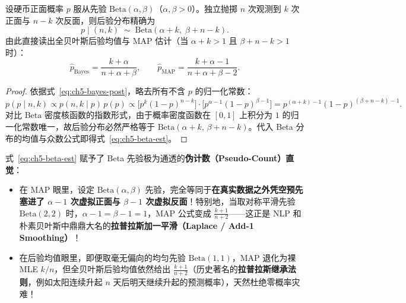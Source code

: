 \begin{thmBox}
\begin{theorem}
\label{thm:ch5-beta-bern}
设硬币正面概率 $p$ 服从先验 $\mathrm{Beta}(\alpha, \beta)$（$\alpha, \beta > 0$）。独立抛掷 $n$ 次观测到 $k$ 次正面与 $n-k$ 次反面，则后验分布精确为
\begin{equation}
  p \mid (n, k) \;\sim\; \mathrm{Beta}(\alpha + k,\; \beta + n - k).
  \label{eq:ch5-beta-post}
\end{equation}
由此直接读出全贝叶斯后验均值与 MAP 估计（当 $\alpha + k > 1$ 且 $\beta + n - k > 1$ 时）：
\begin{equation}
  \hat{p}_{\text{Bayes}} = \frac{k + \alpha}{n + \alpha + \beta},
  \qquad
  \hat{p}_{\text{MAP}} = \frac{k + \alpha - 1}{n + \alpha + \beta - 2}.
  \label{eq:ch5-beta-est}
\end{equation}
\end{theorem}
\end{thmBox}

\begin{proof}
依据式~\eqref{eq:ch5-bayes-post}，略去所有不含 $p$ 的归一化常数：
\[
  p(p \mid n, k)
  \propto p(n, k \mid p)\, p(p)
  \propto \big[p^k (1 - p)^{n-k}\big] \cdot \big[p^{\alpha - 1}(1 - p)^{\beta - 1}\big]
  = p^{(\alpha + k) - 1} (1 - p)^{(\beta + n - k) - 1}.
\]
对比 Beta 密度核函数的指数形式，由于概率密度函数在 $[0,1]$ 上积分为 $1$ 的归一化常数唯一，故后验分布必然严格等于 $\mathrm{Beta}(\alpha + k,\, \beta + n - k)$。代入 Beta 分布的均值与众数公式即得式~\eqref{eq:ch5-beta-est}。
\end{proof}

式~\eqref{eq:ch5-beta-est} 赋予了 Beta 先验极为通透的\textbf{伪计数（Pseudo-Count）直觉}：
\begin{itemize}
  \item 在 MAP 眼里，设定 $\mathrm{Beta}(\alpha, \beta)$ 先验，完全等同于\textbf{在真实数据之外凭空预先塞进了 $\alpha - 1$ 次虚拟正面与 $\beta - 1$ 次虚拟反面}！特别地，当取对称平滑先验 $\mathrm{Beta}(2, 2)$ 时，$\alpha - 1 = \beta - 1 = 1$，MAP 公式变成 $\frac{k + 1}{n + 2}$——这正是 NLP 和朴素贝叶斯中鼎鼎大名的\textbf{拉普拉斯加一平滑（Laplace / Add-1 Smoothing）}！
  \item 在后验均值眼里，即便取毫无偏向的均匀先验 $\mathrm{Beta}(1, 1)$，MAP 退化为裸 MLE $k/n$，但全贝叶斯后验均值依然给出 $\frac{k+1}{n+2}$（历史著名的\textbf{拉普拉斯继承法则}，例如太阳连续升起 $n$ 天后明天继续升起的预测概率），天然杜绝零概率灾难！
\end{itemize}

